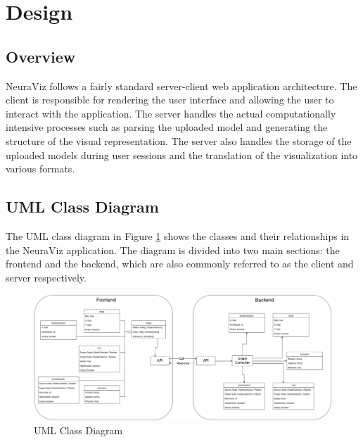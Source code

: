 \section{Design}
\label{sec:Design}

\subsection{Overview} 
NeuraViz follows a fairly standard server-client web application architecture. The client is responsible for rendering the user interface and allowing the user to interact with the application. The server handles the actual computationally intensive processes such as parsing the uploaded model and generating the structure of the visual representation. The server also handles the storage of the uploaded models during user sessions and the translation of the visualization into various formats.

\subsection{UML Class Diagram}
The UML class diagram in Figure \ref{fig:uml_class_diagram} shows the classes and their relationships in the NeuraViz application. The diagram is divided into two main sections: the frontend and the backend, which are also commonly referred to as the client and server respectively. 

\begin{figure}[ht]
    \centering
    \includegraphics[width=1\textwidth]{../docs/diagrams/class_diagram.png}
    \caption{UML Class Diagram}
    \label{fig:uml_class_diagram}
\end{figure}

